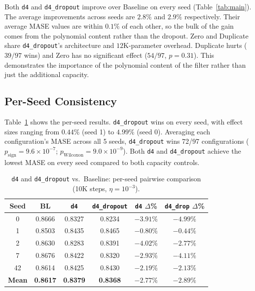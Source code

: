 \documentclass{article}
\begin{document}
Both \texttt{d4} and \texttt{d4\_dropout} improve over Baseline on every seed (Table~\ref{tab:main}). The average improvements across seeds are $2.8\%$ and $2.9\%$ respectively. Their average MASE values are within $0.1\%$ of each other, so the bulk of the gain comes from the polynomial content rather than the dropout. Zero and Duplicate share \texttt{d4\_dropout}'s architecture and $12$K-parameter overhead. Duplicate hurts ($39/97$ wins) and Zero has no significant effect ($54/97$, $p = 0.31$). This demonstrates the importance of the polynomial content of the filter rather than just the additional capacity.

\subsection{Per-Seed Consistency}

Table~\ref{tab:per-seed} shows the per-seed results. \texttt{d4\_dropout} wins on every seed, with effect sizes ranging from $0.44\%$ (seed 1) to $4.99\%$ (seed 0). Averaging each configuration's MASE across all 5 seeds, \texttt{d4\_dropout} wins 72/97 configurations ($p_{\text{sign}} = 9.6 \times 10^{-7}$; $p_{\text{Wilcoxon}} = 9.0 \times 10^{-9}$). Both \texttt{d4} and \texttt{d4\_dropout} achieve the lowest MASE on every seed compared to both capacity controls.

\begin{table}[t]
\centering
\caption{\texttt{d4} and \texttt{d4\_dropout} vs.\ Baseline: per-seed pairwise comparison (10K steps, $\eta = 10^{-3}$).}
\label{tab:per-seed}
\small
\begin{tabular}{cccccc}
\toprule
\textbf{Seed} & \textbf{BL} & \textbf{\texttt{d4}} & \textbf{\texttt{d4\_dropout}} & \textbf{\texttt{d4} $\Delta$\%} & \textbf{\texttt{d4\_drop} $\Delta$\%} \\
\midrule
0 & 0.8666 & 0.8327 & 0.8234 & $-3.91\%$ & $-4.99\%$ \\
1 & 0.8503 & 0.8435 & 0.8465 & $-0.80\%$ & $-0.44\%$ \\
2 & 0.8630 & 0.8283 & 0.8391 & $-4.02\%$ & $-2.77\%$ \\
7 & 0.8676 & 0.8422 & 0.8320 & $-2.93\%$ & $-4.11\%$ \\
42 & 0.8614 & 0.8425 & 0.8430 & $-2.19\%$ & $-2.13\%$ \\
\midrule
\textbf{Mean} & \textbf{0.8617} & \textbf{0.8379} & \textbf{0.8368} & \textbf{$-2.77\%$} & \textbf{$-2.89\%$} \\
\bottomrule
\end{tabular}
\end{table}
\end{document}
